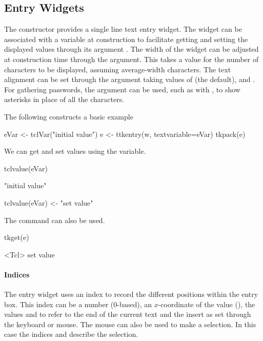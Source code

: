 \subsection{Entry Widgets}
\label{sec:tcltk:entry-widgets}

The  constructor provides a single line text
entry widget. The widget can be associated with a \TCL\/ variable at
construction to facilitate getting and setting the displayed values
through its argument . The width of
the widget can be adjusted at construction time through the
 argument. This takes a value for the number
of characters to be displayed, assuming average-width characters.  The
text alignment can be set through the 
argument taking values of  (the default), 
and . For gathering passwords, the argument
 can be used, such as with \qcode{*},
to show asterisks in place of all the characters.

The following constructs a basic example
\begin{Schunk}
\begin{Sinput}
 eVar <- tclVar("initial value")
 e <- ttkentry(w, textvariable=eVar)
 tkpack(e)
\end{Sinput}
\end{Schunk}

We can get and set values using the \TCL\/ variable.
\begin{Schunk}
\begin{Sinput}
 tclvalue(eVar)
\end{Sinput}
\begin{Soutput}
[1] "initial value"
\end{Soutput}
\begin{Sinput}
 tclvalue(eVar) <- "set value"
\end{Sinput}
\end{Schunk}

The  command can also be used.
\begin{Schunk}
\begin{Sinput}
 tkget(e)
\end{Sinput}
\begin{Soutput}
<Tcl> set value 
\end{Soutput}
\end{Schunk}

\paragraph{Indices}
The entry widget uses an index to record the different positions within the entry box. This index can be a number (0-based), an $x$-coordinate of the value (), the values  and  to refer to the end of the current text and the insert as set through the keyboard or mouse. The mouse can also be used to make a selection. In this case the indices  and  describe the selection.

